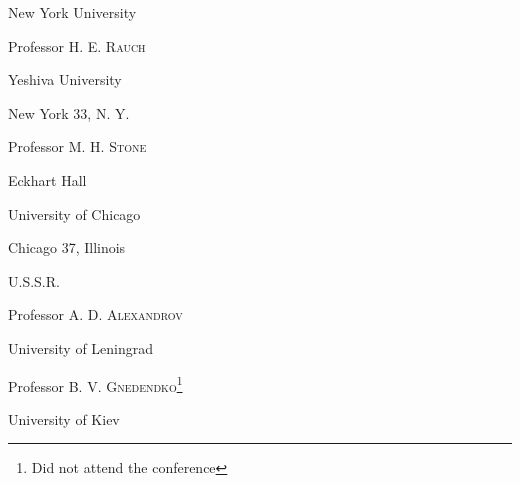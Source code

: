 New York University

\bigskip

Professor H. E. \textsc{Rauch}

Yeshiva University 

New York 33, N. Y.

\bigskip

Professor M. H. \textsc{Stone}

Eckhart Hall

University of Chicago

Chicago 37, Illinois

\medskip
\noindent
\textsc{U.S.S.R.}

\smallskip

Professor A. D. \textsc{Alexandrov}

University of Leningrad

\bigskip

Professor B. V. \textsc{Gnedendko\footnote{Did not attend the conference}}

University of Kiev



